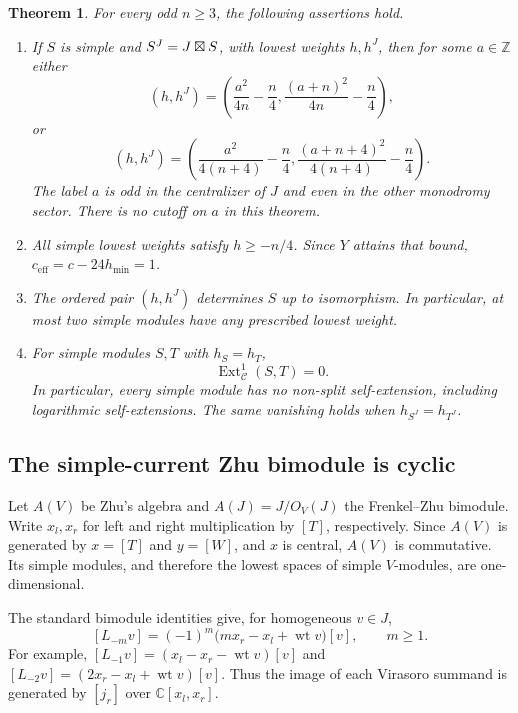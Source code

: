 \documentclass[11pt]{article}
\newtheorem{theorem}{Theorem}[section]
\newcommand{\C}{\mathbb C}\newcommand{\Q}{\mathbb Q}\newcommand{\Z}{\mathbb Z}
\newcommand{\Ext}{\operatorname{Ext}}\newcommand{\wt}{\operatorname{wt}}
\numberwithin{equation}{section}
\begin{document}
\begin{theorem}\label{A:rat:main}
For every odd $n\geq3$, the following assertions hold.
\begin{enumerate}[label=(\roman*),leftmargin=7mm]
\item If $S$ is simple and $S^J=J\boxtimes S$, with lowest weights $h,h^J$, then for some $a\in\Z$ either
\begin{equation}\label{A:rat:pair1}
 (h,h^J)=\left(\frac{a^2}{4n}-\frac n4,
                    \frac{(a+n)^2}{4n}-\frac n4\right),
\end{equation}
or
\begin{equation}\label{A:rat:pair2}
 (h,h^J)=\left(\frac{a^2}{4(n+4)}-\frac n4,
                    \frac{(a+n+4)^2}{4(n+4)}-\frac n4\right).
\end{equation}
The label $a$ is odd in the centralizer of $J$ and even in the other monodromy sector. There is no cutoff on $a$ in this theorem.
\item All simple lowest weights satisfy $h\geq-n/4$. Since $Y$ attains that bound, $c_{\mathrm{eff}}=c-24h_{\min}=1$.
\item The ordered pair $(h,h^J)$ determines $S$ up to isomorphism. In particular, at most two simple modules have any prescribed lowest weight.
\item For simple modules $S,T$ with $h_S=h_T$,
\begin{equation}\label{A:rat:extvanish}
 \Ext^1_{\mathcal C}(S,T)=0.
\end{equation}
In particular, every simple module has no non-split self-extension, including logarithmic self-extensions. The same vanishing holds when $h_{S^J}=h_{T^J}$.
\end{enumerate}
\end{theorem}

\subsection{The simple-current Zhu bimodule is cyclic}
Let $A(V)$ be Zhu's algebra and $A(J)=J/O_V(J)$ the Frenkel--Zhu bimodule. Write $x_l,x_r$ for left and right multiplication by $[T]$, respectively. Since $A(V)$ is generated by $x=[T]$ and $y=[W]$, and $x$ is central, $A(V)$ is commutative. Its simple modules, and therefore the lowest spaces of simple $V$-modules, are one-dimensional.

The standard bimodule identities give, for homogeneous $v\in J$,
\begin{equation}\label{A:rat:VirZhu}
 [L_{-m}v]=(-1)^m\big(mx_r-x_l+\wt v\big)[v],\qquad m\geq1.
\end{equation}
For example, $[L_{-1}v]=(x_l-x_r-\wt v)[v]$ and
$[L_{-2}v]=(2x_r-x_l+\wt v)[v]$. Thus the image of each Virasoro summand is generated by $[j_r]$ over $\C[x_l,x_r]$.
\end{document}
